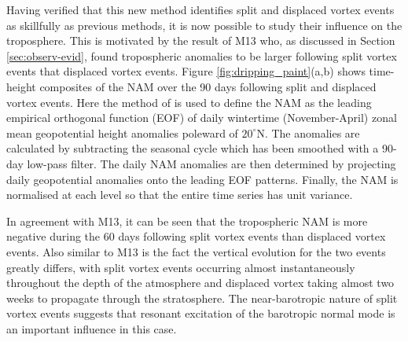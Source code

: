 Having verified that this new method identifies split and displaced vortex
events as skillfully as previous methods, it is now possible to study their
influence on the troposphere. This is motivated by the result of M13 who, as
discussed in Section \ref{sec:observ-evid}, found tropospheric anomalies to be
larger following split vortex events that displaced vortex events. Figure
\ref{fig:dripping_paint}(a,b) shows time-height composites of the NAM over the
90 days following split and displaced vortex events. Here the method of
\citet{Baldwin2009} is used to define the NAM as the leading empirical
orthogonal function (EOF) of daily wintertime (November-April) zonal mean
geopotential height anomalies poleward of $20^{\circ}$N. The anomalies are
calculated by subtracting the seasonal cycle which has been smoothed with a
90-day low-pass filter. The daily NAM anomalies are then determined by
projecting daily geopotential anomalies onto the leading EOF patterns. Finally,
the NAM is normalised at each level so that the entire time series has unit
variance.

In agreement with M13, it can be seen that the tropospheric NAM is more negative
during the 60 days following split vortex events than displaced vortex
events. Also similar to M13 is the fact the vertical evolution for the two
events greatly differs, with split vortex events occurring almost instantaneously
throughout the depth of the atmosphere and displaced vortex taking almost two
weeks to propagate through the stratosphere. The near-barotropic nature of split
vortex events suggests that resonant excitation of the barotropic normal mode
\citep{Esler2005} is an important influence in this case. 

